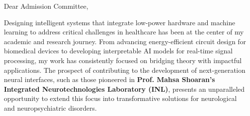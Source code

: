 \documentclass[a4,10pt]{article}
\begin{document}
\begin{large} 

Dear Admission Committee, \par
\vspace{-0.25cm} \quad Designing intelligent systems that integrate low-power hardware and machine learning to address critical challenges in healthcare has been at the center of my academic and research journey. From advancing energy-efficient circuit design for biomedical devices to developing interpretable AI models for real-time signal processing, my work has consistently focused on bridging theory with impactful applications. The prospect of contributing to the development of next-generation neural interfaces, such as those pioneered in \textbf{Prof. Mahsa Shoaran’s Integrated Neurotechnologies Laboratory (INL)}, presents an unparalleled opportunity to extend this focus into transformative solutions for neurological and neuropsychiatric disorders.


\end{large}
\end{document}
